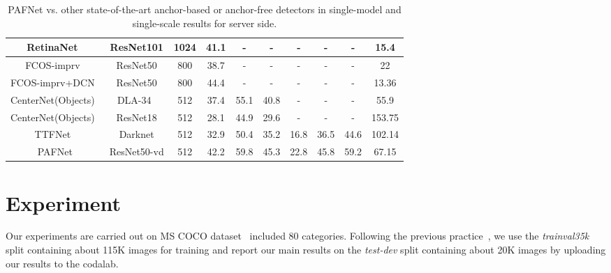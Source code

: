 \documentclass[10pt,twocolumn,letterpaper]{article}
\begin{document}
\begin{table*}
\begin{center}
{\begin{tabular}{c|c|c|c|c|c|c|c|c|c}
    RetinaNet~\cite{lin2017focal}        & ResNet101     &1024       & 41.1   & -         & -         & -      & -      & -       & 15.4                  \\ \hline
    FCOS-imprv~\cite{tian2019fcos}       & ResNet50      &800       & 38.7    & -         & -         & -      & -      & -       & 22                  \\ 
    FCOS-imprv+DCN~\cite{tian2019fcos}   & ResNet50      &800       & 44.4    & -         & -         & -      & -      & -       & 13.36                \\ \hline
    CenterNet(Objects)~\cite{duan2019centernet}  &DLA-34~\cite{yu2018deep} & 512       & 37.4   & 55.1 & 40.8  & -     & -       & -      & 55.9         \\ 
    CenterNet(Objects)~\cite{duan2019centernet}  &ResNet18              & 512          & 28.1   & 44.9 & 29.6  & -     & -       & -      & 153.75       \\ \hline
    TTFNet~\cite{liu2020training}       &Darknet      & 512   & 32.9    & 50.4        & 35.2       & 16.8     & 36.5       & 44.6      & 102.14   \\ \hline
    PAFNet                           &ResNet50-vd   &512      & 42.2 & 59.8     & 45.3      &  22.8 & 45.8    & 59.2    & 67.15                 \\ \hline
    \end{tabular}
    }
    \end{center}
    \caption{PAFNet vs. other state-of-the-art anchor-based or anchor-free detectors in single-model and single-scale results for server side.}
    \label{table3}
    \end{table*}
    


    
	\section{Experiment}
Our experiments are carried out on MS COCO dataset~\cite{lin2014microsoft} included 80 categories. Following the previous practice~\cite{girshick2015fast, kong1904foveabox}, we use the \textit{trainval35k} split containing about 115K images for training and report our main results on the \textit{test-dev} split containing about 20K images by uploading our results to the codalab.
    
\end{document}
